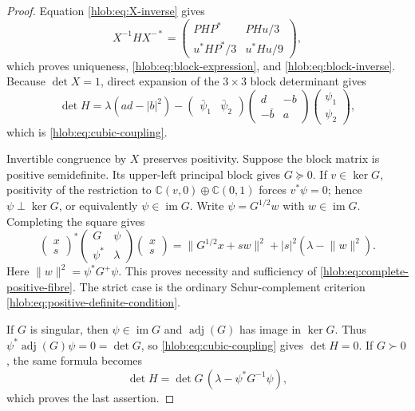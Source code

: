 \begin{proof}
Equation \eqref{hlob:eq:X-inverse} gives
\[
 X^{-1}HX^{-*}
 =\begin{pmatrix}
   PHP^*&PHu/3\\
   u^*HP^*/3&u^*Hu/9
  \end{pmatrix},
\]
which proves uniqueness, \eqref{hlob:eq:block-expression}, and
\eqref{hlob:eq:block-inverse}.  Because \(\det X=1\), direct expansion of
the \(3\times3\) block determinant gives
\[
 \det H
 =\lambda(ad-|b|^2)
  -\begin{pmatrix}\bar\psi_1&\bar\psi_2\end{pmatrix}
   \begin{pmatrix}d&-b\\-\bar b&a\end{pmatrix}
   \begin{pmatrix}\psi_1\\\psi_2\end{pmatrix},
\]
which is \eqref{hlob:eq:cubic-coupling}.

Invertible congruence by \(X\) preserves positivity.  Suppose the block
matrix is positive semidefinite.  Its upper-left principal block gives
\(G\succeq0\).  If \(v\in\ker G\), positivity of the restriction to
\(\mathbb C(v,0)\oplus\mathbb C(0,1)\) forces \(v^*\psi=0\); hence
\(\psi\perp\ker G\), or equivalently
\(\psi\in\operatorname{im}G\).  Write \(\psi=G^{1/2}w\) with
\(w\in\operatorname{im}G\).  Completing the square gives
\[
 \begin{pmatrix}x\\s\end{pmatrix}^*
 \begin{pmatrix}G&\psi\\\psi^*&\lambda\end{pmatrix}
 \begin{pmatrix}x\\s\end{pmatrix}
 =\lVert G^{1/2}x+s w\rVert^2
  +|s|^2(\lambda-\lVert w\rVert^2).
\]
Here \(\lVert w\rVert^2=\psi^*G^+\psi\).  This proves necessity and
sufficiency of \eqref{hlob:eq:complete-positive-fibre}.  The strict case is
the ordinary Schur-complement criterion
\eqref{hlob:eq:positive-definite-condition}.

If \(G\) is singular, then \(\psi\in\operatorname{im}G\) and
\(\operatorname{adj}(G)\) has image in \(\ker G\).  Thus
\(\psi^*\operatorname{adj}(G)\psi=0=\det G\), so
\eqref{hlob:eq:cubic-coupling} gives \(\det H=0\).  If \(G\succ0\), the
same formula becomes
\[
 \det H=\det G\,(\lambda-\psi^*G^{-1}\psi),
\]
which proves the last assertion.
\end{proof}

